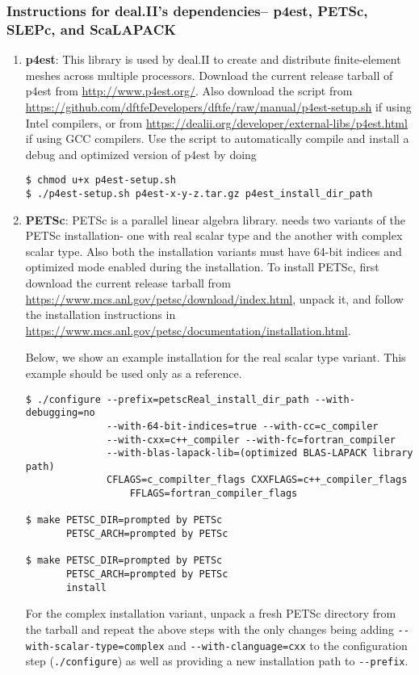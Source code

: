 \subsubsection{Instructions for deal.II's dependencies-- p4est, PETSc, SLEPc, and ScaLAPACK}
\begin{enumerate}
	\item   {\bf p4est}: This library is used by deal.II to create and distribute finite-element meshes across multiple processors. Download the current release tarball of p4est from \url{http://www.p4est.org/}. Also download the script from \url{https://github.com/dftfeDevelopers/dftfe/raw/manual/p4est-setup.sh} if using Intel compilers, or from \url{https://dealii.org/developer/external-libs/p4est.html} if using GCC compilers. Use the script to automatically compile and install a debug and optimized version of p4est by doing
\begin{verbatim}
$ chmod u+x p4est-setup.sh
$ ./p4est-setup.sh p4est-x-y-z.tar.gz p4est_install_dir_path
\end{verbatim}

	\item {\bf PETSc}: PETSc is a parallel linear algebra library. \dftfe{} needs two variants of the PETSc installation- one with real scalar type and the another with complex scalar type. Also both the installation variants must have 64-bit indices and optimized mode enabled during the installation. To install PETSc, first download the current release tarball from \url{https://www.mcs.anl.gov/petsc/download/index.html}, unpack it, and follow the installation instructions in \url{https://www.mcs.anl.gov/petsc/documentation/installation.html}. 
	
Below, we show an example installation for the real scalar type variant. 
This example should be used only as a reference.
\begin{verbatim}
$ ./configure --prefix=petscReal_install_dir_path --with-debugging=no 
              --with-64-bit-indices=true --with-cc=c_compiler
              --with-cxx=c++_compiler --with-fc=fortran_compiler
              --with-blas-lapack-lib=(optimized BLAS-LAPACK library path) 
              CFLAGS=c_compilter_flags CXXFLAGS=c++_compiler_flags
	              FFLAGS=fortran_compiler_flags

$ make PETSC_DIR=prompted by PETSc 
       PETSC_ARCH=prompted by PETSc

$ make PETSC_DIR=prompted by PETSc 
       PETSC_ARCH=prompted by PETSc
       install
\end{verbatim}
For the complex installation variant, unpack a fresh PETSc directory from the tarball and repeat the above steps with the only changes being adding  \verb|--with-scalar-type=complex| and \verb|--with-clanguage=cxx| to the configuration step (\verb|./configure|) as well as providing a new installation path to \verb|--prefix|.


\end{enumerate}
